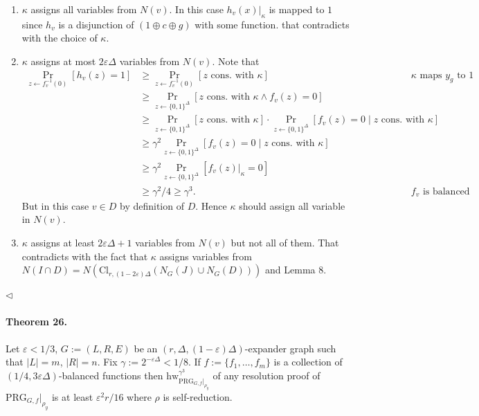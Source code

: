 \documentclass[10pt,a4paper]{article}
\begin{document}
\begin{enumerate}
\item $\kappa$ assigns all variables from $N(v)$. In this case $h_v(x)|_\kappa$ is mapped to $1$ since $h_v$ is a disjunction of $(1\oplus c\oplus g)$ with some function. that contradicts with the choice of $\kappa$.
\item $\kappa$ assigns at most $2\varepsilon\Delta$ variables from $N(v)$. Note that
\begin{align*}
\Pr_{z\leftarrow f_v^{-1}(0)}[h_v(z)=1]&\geq\Pr_{z\leftarrow f_v^{-1}(0)}[z\text{ cons. with }\kappa]&&\kappa\text{ maps }y_g\text{ to }1\\
&\geq\Pr_{z\leftarrow\{0,1\}^\Delta}[z\text{ cons. with }\kappa\wedge f_v(z)=0]\\
&\geq\Pr_{z\leftarrow\{0,1\}^\Delta}[z\text{ cons. with }\kappa]\cdot\Pr_{z\leftarrow\{0,1\}^\Delta}[f_v(z)=0\mid z\text{ cons. with }\kappa]\\
&\geq\gamma^2\Pr_{z\leftarrow\{0,1\}^\Delta}[f_v(z)=0\mid z\text{ cons. with }\kappa]\\
&\geq\gamma^2\Pr_{z\leftarrow\{0,1\}^\Delta}[f_v(z)|_\kappa=0]\\
&\geq\gamma^2/4\geq\gamma^3.&&f_v\text{ is balanced}
\end{align*}
But in this case $v\in D$ by definition of $D$. Hence $\kappa$ should assign all variable in $N(v)$.
\item $\kappa$ assigns at least $2\varepsilon\Delta+1$ variables from $N(v)$ but not all of them. That contradicts with the fact that $\kappa$ assigns variables from $N(I\cap D)=N(\mathrm{Cl}_{r,(1-2\varepsilon)\Delta}(N_G(J)\cup N_G(D)))$ and Lemma 8.
\end{enumerate}\hfill$\triangleleft$
\paragraph{Theorem 26.} Let $\varepsilon<1/3$, $G:=(L,R,E)$ be an $(r,\Delta,(1-\varepsilon)\Delta)$-expander graph such that $|L|=m$, $|R|=n$. Fix $\gamma:=2^{-\varepsilon\Delta}<1/8$. If $f:=\{f_1,\ldots,f_m\}$ is a collection of $(1/4,3\varepsilon\Delta)$-balanced functions then $\mathrm{hw}_{\mathrm{PRG}_{G,f}|_{\rho_y}}^{\gamma^3}$ of any resolution proof of $\mathrm{PRG}_{G,f}|_{\rho_y}$ is at least $\varepsilon^2r/16$ where $\rho$ is self-reduction.
\end{document}
